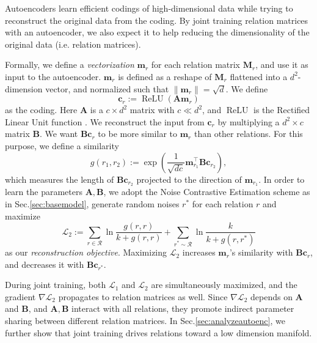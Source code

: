 \documentclass[11pt,a4paper]{article}
\newcommand{\mat}[1]{\bm{#1}}
\renewcommand{\vec}[1]{\bm{#1}}
\newcommand{\setofrels}{\mathcal{R}}
\DeclareMathOperator*{\relu}{ReLU}
\begin{document}

Autoencoders learn efficient codings of high-dimensional data while trying to 
reconstruct the original data from the coding. By joint training relation matrices 
with an autoencoder, we also expect it to 
help reducing the dimensionality of the original data (i.e. relation matrices). 

Formally, we define a \emph{vectorization} $\vec{m}_r$ for each relation matrix 
$\mat{M}_r$, and use it as input to the autoencoder. $\vec{m}_r$ is defined as a reshape 
of $\mat{M}_r$ flattened into a $d^2$-dimension vector, and normalized such 
that $\lVert\vec{m}_r\rVert=\sqrt{d}$. We define 
\begin{equation}\label{eq:coding}
\vec{c}_r:=\relu(\mat{A}\vec{m}_{r})
\end{equation}
as the coding. Here $\mat{A}$ is a $c\times d^2$ matrix with $c\ll d^2$, and 
$\relu$ is the Rectified Linear Unit function \citep{DBLP:conf/icml/NairH10}. 
We reconstruct the input from $\vec{c}_r$ by multiplying a 
$d^2\times c$ matrix $\mat{B}$. We want $\mat{B}\vec{c}_{r}$ to be more similar 
to $\vec{m}_r$ than other relations. For this purpose, we define a similarity  
\begin{equation}
\label{eq:reconscore}
g(r_1, r_2):=\exp(\frac{1}{\sqrt{dc}}\vec{m}_{r_1}^\top\mat{B}\vec{c}_{r_2}), 
\end{equation}
which measures the length of $\mat{B}\vec{c}_{r_2}$ projected to the direction 
of $\vec{m}_{r_1}$. In order to 
learn the parameters $\mat{A},\mat{B}$, we adopt the Noise Contrastive Estimation scheme as in Sec.\ref{sec:basemodel}, 
generate random noises $r^{*}$ for each relation $r$ and maximize 
$$
\mathcal{L}_2:=
\sum_{r\in\setofrels}\ln\frac{g(r, r)}{k+g(r, r)}
+\sum_{r^{*}\sim\setofrels}\ln\frac{k}{k+g(r, r^{*})}
$$
as our \emph{reconstruction objective}. Maximizing $\mathcal{L}_2$ increases 
$\vec{m}_r$'s similarity with $\mat{B}\vec{c}_{r}$, and decreases it with 
$\mat{B}\vec{c}_{r^{*}}$. 


During joint training, both $\mathcal{L}_1$ and $\mathcal{L}_2$ are 
simultaneously maximized, and the gradient $\nabla\mathcal{L}_2$ propagates to 
relation matrices as well. Since $\nabla\mathcal{L}_2$ depends on $\mat{A}$ 
and $\mat{B}$, and 
$\mat{A},\mat{B}$ interact with all relations, they promote indirect 
parameter sharing between different relation matrices. 
In Sec.\ref{sec:analyzeautoenc}, we further 
show that joint training drives relations toward a low dimension manifold.
\end{document}

